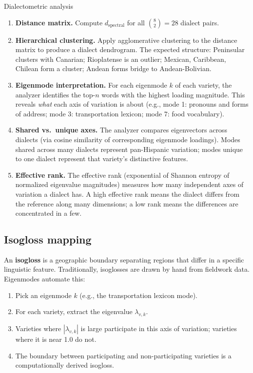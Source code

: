 \documentclass[11pt,a4paper]{article}
\begin{document}
\begin{howbox}{Dialectometric analysis}
\begin{enumerate}[nosep]
  \item \textbf{Distance matrix.} Compute $d_{\text{spectral}}$ for
    all $\binom{8}{2} = 28$ dialect pairs.

  \item \textbf{Hierarchical clustering.} Apply agglomerative
    clustering to the distance matrix to produce a dialect dendrogram.
    The expected structure: Peninsular clusters with Canarian;
    Rioplatense is an outlier; Mexican, Caribbean, Chilean form a
    cluster; Andean forms bridge to Andean-Bolivian.

  \item \textbf{Eigenmode interpretation.} For each eigenmode $k$ of
    each variety, the analyzer identifies the top-$n$ words with the
    highest loading magnitude. This reveals \emph{what} each axis of
    variation is about (e.g., mode 1: pronouns and forms of address;
    mode 3: transportation lexicon; mode 7: food vocabulary).

  \item \textbf{Shared vs.\ unique axes.} The analyzer compares
    eigenvectors across dialects (via cosine similarity of
    corresponding eigenmode loadings). Modes shared across many
    dialects represent pan-Hispanic variation; modes unique to one
    dialect represent that variety's distinctive features.

  \item \textbf{Effective rank.} The effective rank
    (exponential of Shannon entropy of normalized eigenvalue
    magnitudes) measures how many independent axes of variation a
    dialect has. A high effective rank means the dialect differs
    from the reference along many dimensions; a low rank means the
    differences are concentrated in a few.
\end{enumerate}
\end{howbox}

\subsection{Isogloss mapping}

An \textbf{isogloss} is a geographic boundary separating regions that
differ in a specific linguistic feature. Traditionally, isoglosses
are drawn by hand from fieldwork data. Eigenmodes automate this:

\begin{enumerate}[nosep]
  \item Pick an eigenmode $k$ (e.g., the transportation lexicon mode).
  \item For each variety, extract the eigenvalue $\lambda_{v,k}$.
  \item Varieties where $|\lambda_{v,k}|$ is large participate in
    this axis of variation; varieties where it is near 1.0 do not.
  \item The boundary between participating and non-participating
    varieties is a computationally derived isogloss.
\end{enumerate}
\end{document}
